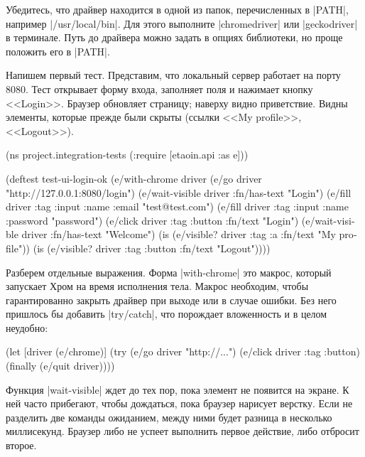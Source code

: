 Убедитесь, что драйвер находится в одной из папок, перечисленных в
\spverb|PATH|, например \spverb|/usr/local/bin|. Для этого выполните
\spverb|chromedriver| или \spverb|geckodriver| в терминале. Путь до драйвера
можно задать в опциях библиотеки, но проще положить его в \spverb|PATH|.

Напишем первый тест. Представим, что локальный сервер работает на порту
8080. Тест открывает форму входа, заполняет поля и нажимает кнопку
<<Login>>. Браузер обновляет страницу; наверху видно приветствие. Видны
элементы, которые прежде были скрыты (ссылки <<My profile>>, <<Logout>>).

\begin{english}
  \begin{clojure}
(ns project.integration-tests
  (:require [etaoin.api :as e]))

(deftest test-ui-login-ok
  (e/with-chrome {} driver
    (e/go driver "http://127.0.0.1:8080/login")
    (e/wait-visible driver {:fn/has-text "Login"})
    (e/fill driver {:tag :input :name :email} "test@test.com")
    (e/fill driver {:tag :input :name :password} "password")
    (e/click driver {:tag :button :fn/text "Login"})
    (e/wait-visible driver {:fn/has-text "Welcome"})
    (is (e/visible? driver {:tag :a :fn/text "My profile"}))
    (is (e/visible? driver {:tag :button :fn/text "Logout"}))))
  \end{clojure}
\end{english}

Разберем отдельные выражения. Форма \spverb|with-chrome| это макрос, который
запускает Хром на время исполнения тела. Макрос необходим, чтобы гарантированно
закрыть драйвер при выходе или в случае ошибки. Без него пришлось бы добавить
\spverb|try/catch|, что порождает вложенность и в целом неудобно:

\begin{english}
  \begin{clojure}
(let [driver (e/chrome)]
  (try
    (e/go driver "http://...")
    (e/click driver {:tag :button})
    (finally
      (e/quit driver))))
  \end{clojure}
\end{english}

Функция \spverb|wait-visible| ждет до тех пор, пока элемент не появится на
экране. К ней часто прибегают, чтобы дождаться, пока браузер нарисует
верстку. Если не разделить две команды ожиданием, между ними будет разница в
несколько миллисекунд. Браузер либо не успеет выполнить первое действие, либо
отбросит второе.

